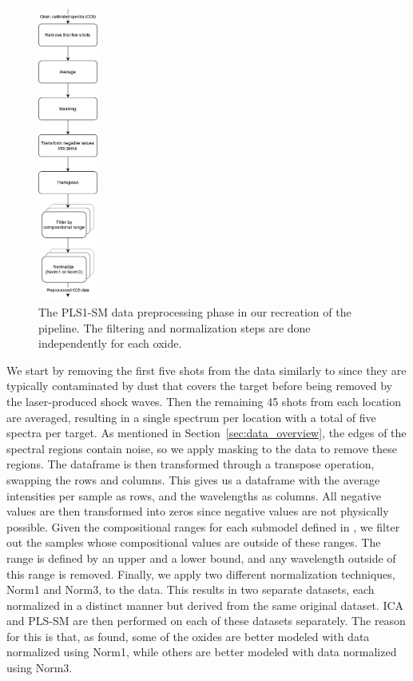 \begin{figure}
	\centering
	\includegraphics[width=0.175\textwidth]{images/pls_preprocessing.png}
	\caption{The PLS1-SM data preprocessing phase in our recreation of the pipeline. The filtering and normalization steps are done independently for each oxide.}
	\label{fig:pls_data_preprocessing}
\end{figure}
\noindent
We start by removing the first five shots from the data similarly to \citet{cleggRecalibrationMarsScience2017} since they are typically contaminated by dust that covers the target before being removed by the laser-produced shock waves.
Then the remaining 45 shots from each location are averaged, resulting in a single spectrum per location with a total of five spectra per target.
As mentioned in Section~\ref{sec:data_overview}, the edges of the spectral regions contain noise, so we apply masking to the data to remove these regions.
The dataframe is then transformed through a transpose operation, swapping the rows and columns.
This gives us a dataframe with the average intensities per sample as rows, and the wavelengths as columns.
All negative values are then transformed into zeros since negative values are not physically possible.
Given the compositional ranges for each submodel defined in \citet{andersonImprovedAccuracyQuantitative2017}, we filter out the samples whose compositional values are outside of these ranges.
The range is defined by an upper and a lower bound, and any wavelength outside of this range is removed.
Finally, we apply two different normalization techniques, Norm1 and Norm3, to the data.
This results in two separate datasets, each normalized in a distinct manner but derived from the same original dataset.
ICA and PLS-SM are then performed on each of these datasets separately.
The reason for this is that, as \citet{cleggRecalibrationMarsScience2017} found, some of the oxides are better modeled with data normalized using Norm1, while others are better modeled with data normalized using Norm3.

